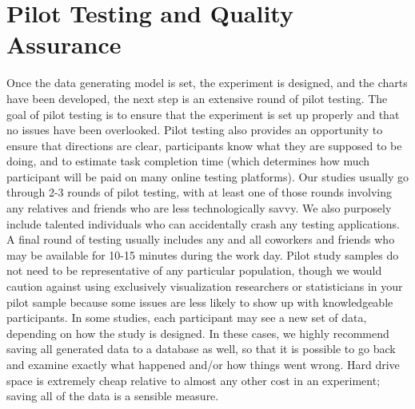 \documentclass[
  10pt,
  letterpaper,
  DIV=11,
  numbers=noendperiod]{scrartcl}
\providecommand{\DIFaddend}{} %
\DeclareRobustCommand{\DIFaddend}{\DIFOaddend \let\includegraphics\DIFOincludegraphics} %
\begin{document}
\DIFaddend \section{Pilot Testing and Quality Assurance}\label{sec-pilot-test}

Once the data generating model is set, the experiment is designed, and
the charts have been developed, the next step is an extensive round of
pilot testing. The goal of pilot testing is to ensure that the
experiment is set up properly and that no issues have been overlooked.
Pilot testing also provides an opportunity to ensure that directions are
clear, participants know what they are supposed to be doing, and to
estimate task completion time (which determines how much participant
will be paid on many online testing platforms). Our studies usually go
through 2-3 rounds of pilot testing, with at least one of those rounds
involving any relatives and friends who are less technologically savvy.
We also purposely include talented individuals who can accidentally
crash any testing applications. A final round of testing usually
includes any and all coworkers and friends who may be available for
10-15 minutes during the work day. Pilot study samples do not need to be
representative of any particular population, though we would caution
against using exclusively visualization researchers or statisticians in
your pilot sample because some issues are less likely to show up with
knowledgeable participants. In some studies, each participant may see a
new set of data, depending on how the study is designed. In these cases,
we highly recommend saving all generated data to a database as well, so
that it is possible to go back and examine exactly what happened and/or
how things went wrong. Hard drive space is extremely cheap relative to
almost any other cost in an experiment; saving all of the data is a
sensible measure.
\end{document}
